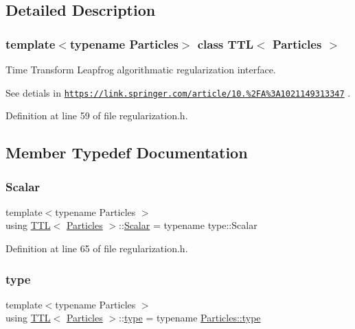 \subsection{Detailed Description}
\subsubsection*{template$<$typename Particles$>$\newline
class T\+T\+L$<$ Particles $>$}

Time Transform Leapfrog algorithmatic regularization interface. 

See detials in \href{https://link.springer.com/article/10.1023%2FA%3A1021149313347}{\tt https\+://link.\+springer.\+com/article/10.\+1023\%2\+F\+A\%3\+A1021149313347} . 

Definition at line 59 of file regularization.\+h.



\subsection{Member Typedef Documentation}
\mbox{\label{class_t_t_l_a8d541e387362cebeb59841d22d78f2b4}} 
\subsubsection{\texorpdfstring{Scalar}{Scalar}}
{\footnotesize\ttfamily template$<$typename Particles $>$ \\
using \mbox{\hyperlink{class_t_t_l}{T\+TL}}$<$ \mbox{\hyperlink{struct_particles}{Particles}} $>$\+::\mbox{\hyperlink{class_t_t_l_a8d541e387362cebeb59841d22d78f2b4}{Scalar}} =  typename type\+::\+Scalar}



Definition at line 65 of file regularization.\+h.

\mbox{\label{class_t_t_l_af4afef1cacfe12873d9d97ca04d66d11}} 
\subsubsection{\texorpdfstring{type}{type}}
{\footnotesize\ttfamily template$<$typename Particles $>$ \\
using \mbox{\hyperlink{class_t_t_l}{T\+TL}}$<$ \mbox{\hyperlink{struct_particles}{Particles}} $>$\+::\mbox{\hyperlink{class_t_t_l_af4afef1cacfe12873d9d97ca04d66d11}{type}} =  typename \mbox{\hyperlink{class_vel_indep_particles_a0c62b43c2f0a50565e5e06587fddee18}{Particles\+::type}}}



